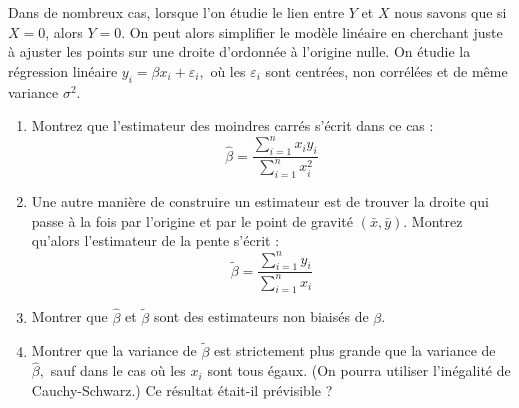 \documentclass{../headers/td_upc}
\providecommand{\1}{\mathds{1}}
\begin{document}
	\exo{}
	Dans de nombreux cas, 
	lorsque l'on étudie le lien entre $Y$ et $X$ nous savons que si $X=0$, alors $Y=0$. 
	On peut alors simplifier le modèle linéaire en cherchant juste à ajuster 
	les points sur une droite d'ordonnée à l'origine nulle. 
	On étudie la régression linéaire 
	$y_{i}=\beta x_{i}+\varepsilon_{i},$ où les $\varepsilon_{i}$ sont centrées,
	non corrélées et de même variance $\sigma^{2}$. 
	\begin{enumerate}
	  \item Montrez que l'estimateur des moindres carrés s'écrit dans ce cas :
	  \[
	  \hat{\beta}=\frac{\sum_{i=1}^{n} x_{i} y_{i}}{\sum_{i=1}^{n} x_{i}^{2}}
	  \]
		\item Une autre manière de construire un estimateur est de trouver la droite
		qui passe à la fois par l'origine et par le point de gravité $(\bar{x}, \bar y)$.
		Montrez qu'alors l'estimateur de la pente s'écrit :
		\[
	  \tilde{\beta}=\frac{\sum_{i=1}^{n} y_{i}}{\sum_{i=1}^{n} x_{i}}
	  \]
		\item   Montrer que $\hat{\beta}$ et $\tilde{\beta}$ sont des estimateurs non biaisés de $\beta$.
		\item   Montrer que la variance de $\tilde{\beta}$ est strictement plus grande que la variance de
		$\hat{\beta},$ sauf dans le cas où les $x_{i}$ sont tous égaux. (On pourra utiliser l'inégalité de Cauchy-Schwarz.)
		Ce résultat était-il prévisible ?
\end{enumerate}
\end{document}
